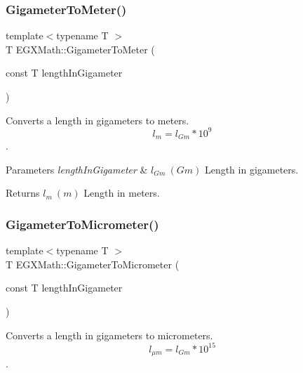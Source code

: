 \subsubsection{\texorpdfstring{Gigameter\+To\+Meter()}{GigameterToMeter()}}
{\footnotesize\ttfamily template$<$typename T $>$ \\
T E\+G\+X\+Math\+::\+Gigameter\+To\+Meter (\begin{DoxyParamCaption}\item[{const T}]{length\+In\+Gigameter }\end{DoxyParamCaption})}



Converts a length in gigameters to meters. \[ l_{m}=l_{Gm} * 10^{9}\]. 


\begin{DoxyParams}{Parameters}
{\em length\+In\+Gigameter} & $ l_{Gm}\ (Gm)$ Length in gigameters. \\
\hline
\end{DoxyParams}
\begin{DoxyReturn}{Returns}
$ l_{m}\ (m)$ Length in meters. 
\end{DoxyReturn}
\mbox{\label{group___e_g_x_math-_conversions-_length_conversions-_gigameter-_s_i_ga02f73d15581b1cd69a79b843186211f5}} 
\subsubsection{\texorpdfstring{Gigameter\+To\+Micrometer()}{GigameterToMicrometer()}}
{\footnotesize\ttfamily template$<$typename T $>$ \\
T E\+G\+X\+Math\+::\+Gigameter\+To\+Micrometer (\begin{DoxyParamCaption}\item[{const T}]{length\+In\+Gigameter }\end{DoxyParamCaption})}



Converts a length in gigameters to micrometers. \[ l_{\mu m}=l_{Gm} * 10^{15} \]. 

